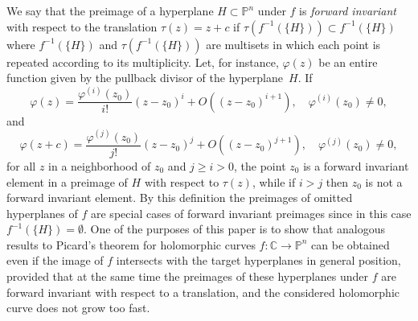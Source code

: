 \documentclass{amsart}
\newcommand{\C}{\mathbb{C}}
\renewcommand{\P}{\mathbb{P}}
\theoremstyle{definition}
\numberwithin{equation}{section}
\numberwithin{theorem}{section}
\begin{document}
We say that the preimage of a hyperplane $H\subset\P^n$ under
$f$ is \textit{forward invariant} with respect to the translation
$\tau(z)= z+c$ if $\tau(f^{-1}(\{H\}))\subset f^{-1}(\{H\})$ where
$f^{-1}(\{H\})$ and $\tau(f^{-1}(\{H\}))$ are multisets in which
each point is repeated according to its multiplicity. Let, for instance,
$\varphi(z)$ be an entire function given by the pullback divisor
of the hyperplane~$H$. If
	\begin{equation*}
	\varphi(z)=\frac{\varphi^{(i)}(z_0)}{i!}(z-z_0)^i+O((z-z_0)^{i+1}),\quad \varphi^{(i)}(z_0)\not=0,
	\end{equation*}	
and
	\begin{equation*}
	\varphi(z+c)=\frac{\varphi^{(j)}(z_0)}{j!}(z-z_0)^j+O((z-z_0)^{j+1}),\quad \varphi^{(j)}(z_0)\not=0,
	\end{equation*}	
for all $z$ in a neighborhood of $z_0$ and $j\geq i>0$, the point $z_0$ is a
forward invariant element in a preimage of $H$ with respect
to $\tau(z)$, while if $i> j$ then $z_0$ is not a forward
invariant element. By this definition the preimages of omitted
hyperplanes of $f$ are special cases of forward
invariant preimages since in this case $f^{-1}(\{H\})=\emptyset$.
One of the purposes of this paper is to show that analogous
results to Picard's theorem for holomorphic curves $f:\C\to\P^n$
can be obtained even if the image of $f$ intersects with the
target hyperplanes in general position, provided that at the same
time the preimages of these hyperplanes under $f$ are forward invariant with respect to a translation, and the considered holomorphic curve does not grow too fast.
\end{document}
